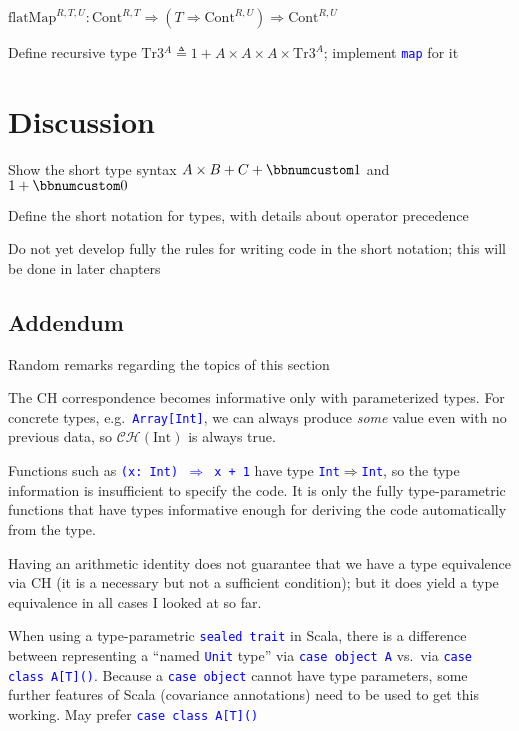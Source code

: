 {\footnotesize{}$\text{flatMap}^{R,T,U}:\text{Cont}^{R,T}\Rightarrow(T\Rightarrow\text{Cont}^{R,U})\Rightarrow\text{Cont}^{R,U}$}{\footnotesize\par}

Define recursive type {\footnotesize{}$\text{Tr3}{}^{A}\triangleq1+A\times A\times A\times\text{Tr3}^{A}$};
implement \texttt{\textcolor{blue}{\footnotesize{}map}} for it 

\section{Discussion}

Show the short type syntax $A\times B+C+\bbnum 1$ and $1+\bbnum 0$

Define the short notation for types, with details about operator precedence

Do not yet develop fully the rules for writing code in the short notation;
this will be done in later chapters 

\subsection{Addendum}

Random remarks regarding the topics of this section

The CH correspondence becomes informative only with parameterized
types. For concrete types, e.g.\ \texttt{\textcolor{blue}{\footnotesize{}Array{[}Int{]}}},
we can always produce \emph{some} value even with no previous data,
so $\mathcal{CH}(\text{Int})$ is always true.

Functions such as \texttt{\textcolor{blue}{\footnotesize{}(x:\ Int)
$\Rightarrow$ x + 1}} have type \texttt{\textcolor{blue}{\footnotesize{}Int}}$\Rightarrow$\texttt{\textcolor{blue}{\footnotesize{}Int}},
so the type information is insufficient to specify the code. It is
only the fully type-parametric functions that have types informative
enough for deriving the code automatically from the type.

Having an arithmetic identity does not guarantee that we have a type
equivalence via CH (it is a necessary but not a sufficient condition);
but it does yield a type equivalence in all cases I looked at so far.

When using a type-parametric \texttt{\textcolor{blue}{\footnotesize{}sealed
trait}} in Scala, there is a difference between representing a ``named
\texttt{\textcolor{blue}{\footnotesize{}Unit}} type'' via \texttt{\textcolor{blue}{\footnotesize{}case
object A}} vs.\ via \texttt{\textcolor{blue}{\footnotesize{}case
class A{[}T{]}()}}. Because a \texttt{\textcolor{blue}{\footnotesize{}case
object}} cannot have type parameters, some further features of Scala
(covariance annotations) need to be used to get this working. May
prefer \texttt{\textcolor{blue}{\footnotesize{}case class A{[}T{]}()}} 

